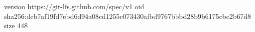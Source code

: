 version https://git-lfs.github.com/spec/v1
oid sha256:dcb7af19fd7ebd6d94a08cd1255c073430afbd9767bbbd28b9b6175cbe2b67d8
size 448
